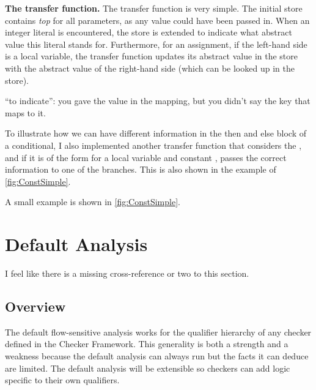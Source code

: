     \textbf{The transfer function.} The transfer function is very simple. The initial store contains
    \emph{top} for all parameters, as any value could have been passed in.  When 
    an integer literal is encountered, the store is extended to indicate what abstract value this literal
    stands for. Furthermore, for an assignment, if the left-hand side is
    a local variable, the transfer function updates its abstract value in the
    store with the abstract value of the right-hand side (which can be looked up in the store).
    
\begin{workinprogress}
``to indicate'':  you gave the value in the mapping, but you didn't say the
key that maps to it.
\end{workinprogress}

    To illustrate how we can have different information in the then and else block of a conditional,
    I also implemented another transfer function that considers the , and if
    it is of the form  for a local variable  and constant , passes
    the correct information to one of the branches. This is also shown in the example of \autoref{fig:ConstSimple}.
    
     A small example is shown in \autoref{fig:ConstSimple}.




\section{Default Analysis}

\begin{workinprogress}
I feel like there is a missing cross-reference or two to this section.
\end{workinprogress}

\subsection{Overview}

The default flow-sensitive analysis  works for the qualifier hierarchy of any checker defined in 
the Checker Framework.  This generality is both a strength and a weakness because the 
default analysis can
always run but the facts it can deduce are limited.  The default analysis
will be extensible so checkers can add logic specific to their own qualifiers.

